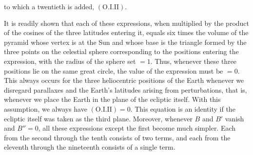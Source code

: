 to which a twentieth is added, $(\mathrm{O}.\mathrm{I}.\mathrm{II})$.
\par
It is readily shown that each of these expressions, when multiplied by the product of the cosines of the three latitudes entering it, equals six times the volume of the pyramid whose vertex is at the Sun and whose base is the triangle formed by the three points on the celestial sphere corresponding to the positions entering the expression, with the radius of the sphere set $=1$. Thus, whenever these three positions lie on the same great circle, the value of the expression must be $=0$. This always occurs for the three heliocentric positions of the Earth whenever we disregard parallaxes and the Earth's latitudes arising from perturbations, that is, whenever we place the Earth in the plane of the ecliptic itself. With this assumption, we always have $(\mathrm{O}.\mathrm{I}.\mathrm{II})=0$. This equation is an identity if the ecliptic itself was taken as the third plane. Moreover, whenever $B$ and $B'$ vanish and $B''=0$, all these expressions except the first become much simpler. Each from the second through the tenth consists of two terms, and each from the eleventh through the nineteenth consists of a single term.
